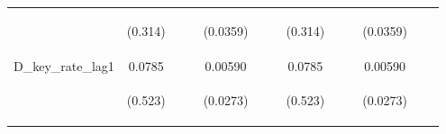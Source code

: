 \documentclass[]{article}
\begin{document}
\begin{center}
\begin{tabular}{lcccccccccccc}
\vspace{4pt} & \begin{footnotesize}(0.314)\end{footnotesize} & \begin{footnotesize}\end{footnotesize} & \begin{footnotesize}\end{footnotesize} & \begin{footnotesize}(0.0359)\end{footnotesize} & \begin{footnotesize}\end{footnotesize} & \begin{footnotesize}\end{footnotesize} & \begin{footnotesize}(0.314)\end{footnotesize} & \begin{footnotesize}\end{footnotesize} & \begin{footnotesize}\end{footnotesize} & \begin{footnotesize}(0.0359)\end{footnotesize} & \begin{footnotesize}\end{footnotesize} & \begin{footnotesize}\end{footnotesize} \\
D\_key\_rate\_lag1 & 0.0785 &  &  & 0.00590 &  &  & 0.0785 &  &  & 0.00590 &  &  \\
\vspace{4pt} & \begin{footnotesize}(0.523)\end{footnotesize} & \begin{footnotesize}\end{footnotesize} & \begin{footnotesize}\end{footnotesize} & \begin{footnotesize}(0.0273)\end{footnotesize} & \begin{footnotesize}\end{footnotesize} & \begin{footnotesize}\end{footnotesize} & \begin{footnotesize}(0.523)\end{footnotesize} & \begin{footnotesize}\end{footnotesize} & \begin{footnotesize}\end{footnotesize} & \begin{footnotesize}(0.0273)\end{footnotesize} & \begin{footnotesize}\end{footnotesize} & \begin{footnotesize}\end{footnotesize} \\

\end{tabular}
\end{center}
\end{document}
